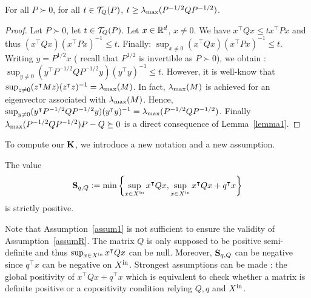 \documentclass[10pt]{article}
\begin{document}
\begin{prop}
For all $P\succ 0$, for all $t\in\mathcal{T}_{Q}(P)$, $t\geq \lambda_{\operatorname{max}}(P^{-1/2} Q P^{-1/2})$.
\end{prop}
\begin{proof}
Let $P\succ 0$, let $t\in\mathcal{T}_{Q}(P)$. Let $x\in\mathbb R^d$, $x\neq 0$. We have 
$x^\intercal Q x\leq t x^\intercal P x$ and thus $(x^\intercal Q x)(x^\intercal P x)^{-1}\leq t$. Finally:
$\sup_{x\neq 0}(x^\intercal Q x)(x^\intercal P x)^{-1}\leq t $. Writing $y=P^{1/2}x$ ( recall that $P^{1/2}$ is invertible as $P\succ 0$), we obtain :
$\sup_{y\neq 0}(y^\intercal P^{-1/2}Q P^{-1/2}y)(y^\intercal y)^{-1}\leq t $. However, it is well-know that
$\sup_{z\neq 0} (z^\intercal M z)(z^\intercal z)^{-1}=\lambda_{\operatorname{max}}(M)$. In fact, $\lambda_{\operatorname{max}}(M)$ is achieved for an eigenvector associated with $\lambda_{\operatorname{max}}(M)$. Hence, 
$\sup_{y\neq 0} (y^\intercal P^{-1/2}Q P^{-1/2}y)(y^\intercal y)^{-1}=\lambda_{\operatorname{max}}(P^{-1/2} Q P^{-1/2})$. Finally $\lambda_{\operatorname{max}}(P^{-1/2} Q P^{-1/2})P-Q\succeq 0$ is a direct consequence of Lemma~\ref{lemma1}. 

\end{proof}
\begin{comment}
\begin{prop}
For all matrix $A$ of size $d\times d$ such that the spectral radius is strictly smaller than 1. For all symmetric matrix $Q$ of size $d\times d$: 
\begin{enumerate}
\item For all positive reals $t,t'$ such that $t\leq t'$, $\displaystyle{\lyat{A,Q}}\subseteq \displaystyle{\mathcal{L}_{A,Q}(t')}$;
\item For all $P\succ 0$, $\lmin{P}^{-1}\lmax{Q}\in\conq(P)$;
\item $\displaystyle{\bigcup_{t>0} \lyat{A,Q}}=\displaystyle{\lyap{A}}$.
\end{enumerate}
\end{prop}
\end{comment}
To compute our $\mathbf{K}$, we introduce a new notation and a new assumption. 
 \begin{assumption}
\label{assumR}
The value \[\mathbf{S}_{q,Q}:=\min\left\{\sup_{x\in X^\mathrm{in}} x^\intercal Q x , \sup_{x\in X^\mathrm{in}} x^\intercal Q x+q^\intercal x\right\}\] is strictly positive.
\end{assumption}

Note that Assumption~\ref{assum1} is not sufficient to ensure the validity of Assumption~\ref{assumR}. The matrix $Q$ is only supposed to be positive semi-definite and thus $\sup_{x\in X^\mathrm{in}} x^\intercal Q x$ can be null. Moreover, $\mathbf{S}_{q,Q}$ can be negative since $q^\intercal x$ can be negative on $X^\mathrm{in}$. Strongest assumptions can be made : the global positivity of $x^\intercal Q x+q^\intercal x$ which is equivalent to check whether a matrix is definite positive or a copositivity condition relying $Q,q$ and $X^\mathrm{in}$. 
\end{document}
